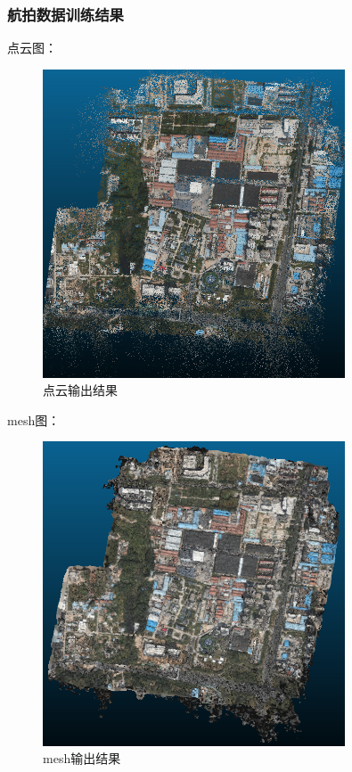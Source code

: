 \documentclass{nwputhesis}
\begin{document}
\subsubsection{航拍数据训练结果}
点云图：
\begin{figure}[H]
    \centering
    \includegraphics[width=0.8\textwidth]{picture/20.png}
    \caption{点云输出结果}
\end{figure}
\makespace
mesh图：
\begin{figure}[H]
    \centering
    \includegraphics[width=0.8\textwidth]{picture/19.png}
    \caption{mesh输出结果}
\end{figure}
\end{document}
